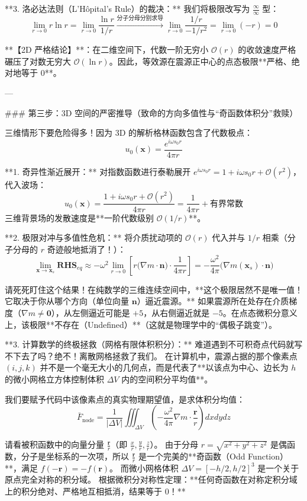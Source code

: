 \documentclass[12pt]{article}
\begin{document}
{**3. 洛必达法则（L'Hôpital's Rule）的裁决：**
我们将极限改写为 $\frac{\infty}{\infty}$ 型：
$$
\lim_{r \to 0} r \ln r = \lim_{r \to 0} \frac{\ln r}{1/r} \xrightarrow{\text{分子分母分别求导}} \lim_{r \to 0} \frac{1/r}{-1/r^2} = \lim_{r \to 0} (-r) = 0
$$

**【2D 严格结论】**：在二维空间下，代数一阶无穷小 $\mathcal{O}(r)$ 的收敛速度严格碾压了对数无穷大 $\mathcal{O}(\ln r)$。因此，等效源在震源正中心的点态极限**严格、绝对地等于 $0$**。

---

### 第三步：3D 空间的严密推导（致命的方向多值性与“奇函数体积分”救赎）

三维情形下要危险得多！因为 3D 的解析格林函数包含了代数极点：
$$
u_0(\mathbf{x}) = \frac{e^{i \omega s_0 r}}{4\pi r}
$$

**1. 奇异性渐近展开：**
对指数函数进行泰勒展开 $e^{i\omega s_0 r} = 1 + i\omega s_0 r + \mathcal{O}(r^2)$，代入波场：
$$
u_0(\mathbf{x}) = \frac{1 + i\omega s_0 r + \mathcal{O}(r^2)}{4\pi r} = \frac{1}{4\pi r} + \text{有界常数}
$$
三维背景场的发散速度是**一阶代数级别 $\mathcal{O}(1/r)$**。

**2. 极限对冲与多值性危机：**
将介质扰动项的 $\mathcal{O}(r)$ 代入并与 $1/r$ 相乘（分子分母的 $r$ 奇迹般地抵消了！）：
$$
\lim_{\mathbf{x} \to \mathbf{x}_s} \mathbf{RHS}_{eq} \approx -\omega^2 \lim_{r \to 0} \left[ r \big(\nabla m \cdot \mathbf{n}\big) \cdot \frac{1}{4\pi r} \right] = -\frac{\omega^2}{4\pi} \Big( \nabla m(\mathbf{x}_s) \cdot \mathbf{n} \Big)
$$

请死死盯住这个结果！在纯数学的三维连续空间中，**这个极限居然不是唯一值！它取决于你从哪个方向（单位向量 $\mathbf{n}$）逼近震源。** 
如果震源所在处存在介质梯度（$\nabla m \neq \mathbf{0}$），从左侧逼近可能是 $+5$，从右侧逼近就是 $-5$。在点态微积分意义上，该极限**不存在（Undefined）**（这就是物理学中的“偶极子跳变”）。

**3. 计算数学的终极拯救（网格有限体积积分）：**
难道遇到不可积奇点代码就写不下去了吗？绝不！离散网格拯救了我们。
在计算机中，震源占据的那个像素点 $(i, j, k)$ 并不是一个毫无大小的几何点，而是代表了**以该点为中心、边长为 $h$ 的微小网格立方体控制体积 $\Delta V$ 内的空间积分平均值**。

我们要赋予代码中该像素点的真实物理期望值，是求体积分均值：
$$
\bar{F}_{\text{node}} = \frac{1}{|\Delta V|} \iiint_{\Delta V} \left( -\frac{\omega^2}{4\pi} \nabla m \cdot \frac{\mathbf{r}}{r} \right) dx dy dz
$$

请看被积函数中的向量分量 $\frac{\mathbf{r}}{r}$（即 $\frac{x}{r}, \frac{y}{r}, \frac{z}{r}$）。
由于分母 $r = \sqrt{x^2+y^2+z^2}$ 是偶函数，分子是坐标系的一次项，所以 $\frac{\mathbf{r}}{r}$ 是一个完美的**奇函数（Odd Function）**，满足 $f(-\mathbf{r}) = -f(\mathbf{r})$。
而微小网格体积 $\Delta V = [-h/2, h/2]^3$ 是一个关于原点完全对称的积分域。
根据微积分对称性定理：**任何奇函数在对称定积分域上的积分绝对、严格地互相抵消，结果等于 $0$！**

}
\end{document}
